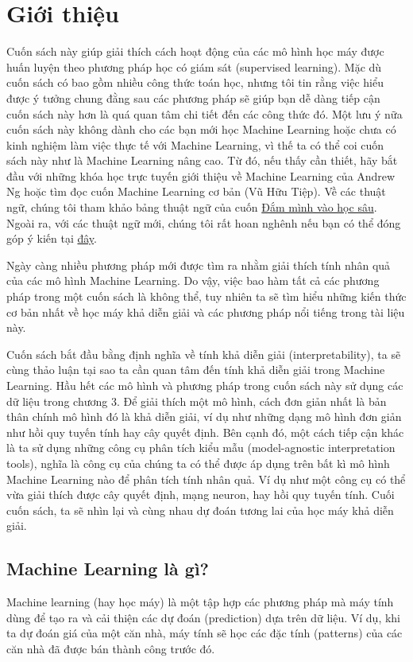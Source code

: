 \chapter{Giới thiệu}
Cuốn sách này giúp giải thích cách hoạt động của các mô hình học máy được huấn luyện theo phương pháp học có giám sát (supervised learning). Mặc dù cuốn sách có bao gồm nhiều công thức toán học, nhưng tôi tin rằng việc hiểu được ý tưởng chung đằng sau các phương pháp sẽ giúp bạn dễ dàng tiếp cận cuốn sách này hơn là quá quan tâm chi tiết đến các công thức đó. Một lưu ý nữa cuốn sách này không dành cho các bạn mới học Machine Learning hoặc chưa có kinh nghiệm làm việc thực tế với Machine Learning, vì thế ta có thể coi cuốn sách này như là Machine Learning nâng cao. Từ đó, nếu thấy cần thiết, hãy bắt đầu với những khóa học trực tuyến giới thiệu về Machine Learning của Andrew Ng hoặc tìm đọc cuốn Machine Learning cơ bản (Vũ Hữu Tiệp). Về các thuật ngữ, chúng tôi tham khảo bảng thuật ngữ của cuốn \href{https://d2l.aivivn.com/glossary.html}{Đắm mình vào học sâu}. Ngoài ra, với các thuật ngữ mới, chúng tôi rất hoan nghênh nếu bạn có thể đóng góp ý kiến tại \href{https://github.com/giangnguyen2412/InterpretableMLBook-Vietnamese/issues}{đây}.

Ngày càng nhiều phương pháp mới được tìm ra nhằm giải thích tính nhân quả của các mô hình Machine Learning. Do vậy, việc bao hàm tất cả các phương pháp trong một cuốn sách là không thể, tuy nhiên ta sẽ tìm hiểu những kiến thức cơ bản nhất về học máy khả diễn giải và các phương pháp nổi tiếng trong tài liệu này.

Cuốn sách bắt đầu bằng định nghĩa về tính khả diễn giải (interpretability), ta sẽ cùng thảo luận tại sao ta cần quan tâm đến tính khả diễn giải trong Machine Learning. Hầu hết các mô hình và phương pháp trong cuốn sách này sử dụng các dữ liệu trong chương 3. Để giải thích một mô hình, cách đơn giản nhất là bản thân chính mô hình đó là khả diễn giải, ví dụ như những dạng mô hình đơn giản như hồi quy tuyến tính hay cây quyết định. Bên cạnh đó, một cách tiếp cận khác là ta sử dụng những công cụ phân tích kiểu mẫu (model-agnostic interpretation tools), nghĩa là công cụ của chúng ta có thể được áp dụng trên bất kì mô hình Machine Learning nào để phân tích tính nhân quả. Ví dụ như một công cụ có thể vừa giải thích được cây quyết định, mạng neuron, hay hồi quy tuyến tính. Cuối cuốn sách, ta sẽ nhìn lại và cùng nhau dự đoán tương lai của học máy khả diễn giải.

\section{Machine Learning là gì?}
Machine learning (hay học máy) là một tập hợp các phương pháp mà máy tính dùng để tạo ra và cải thiện các dự đoán (prediction) dựa trên dữ liệu. Ví dụ, khi ta dự đoán giá của một căn nhà, máy tính sẽ học các đặc tính (patterns) của các căn nhà đã được bán thành công trước đó.

